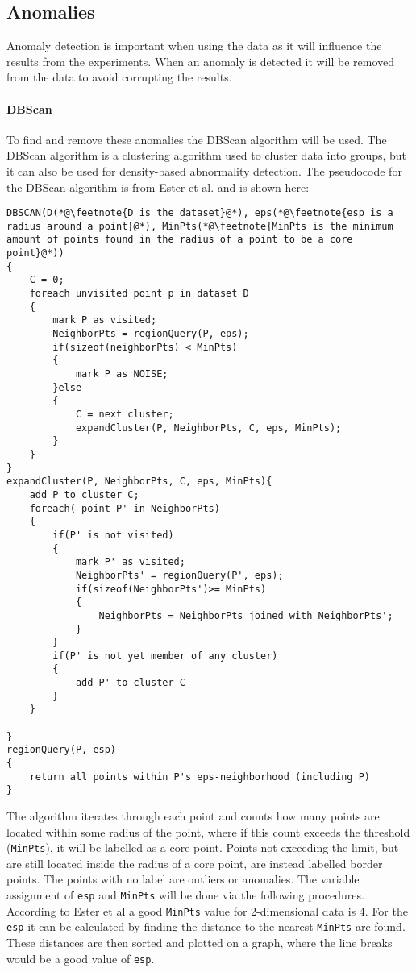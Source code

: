 \subsection{Anomalies}
Anomaly detection is important when using the data as it will influence the results from the experiments. When an anomaly is detected it will be removed from the data to avoid corrupting the results.
\paragraph{DBScan}
To find and remove these anomalies the DBScan algorithm will be used. The DBScan algorithm is a clustering algorithm used to cluster data into groups, but it can also be used for density-based abnormality detection. The pseudocode for the DBScan algorithm is from Ester et al.\cite{ester1996density} and is shown here:
\begin{lstlisting}
DBSCAN(D(*@\feetnote{D is the dataset}@*), eps(*@\feetnote{esp is a radius around a point}@*), MinPts(*@\feetnote{MinPts is the minimum amount of points found in the radius of a point to be a core point}@*))
{
    C = 0;
    foreach unvisited point p in dataset D
    {
        mark P as visited;
        NeighborPts = regionQuery(P, eps);
        if(sizeof(neighborPts) < MinPts)
        {
            mark P as NOISE;
        }else
        {
            C = next cluster;
            expandCluster(P, NeighborPts, C, eps, MinPts);
        }
    }
}
expandCluster(P, NeighborPts, C, eps, MinPts){
    add P to cluster C;
    foreach( point P' in NeighborPts)
    {
        if(P' is not visited)
        {
            mark P' as visited;
            NeighborPts' = regionQuery(P', eps);
            if(sizeof(NeighborPts')>= MinPts)
            {
                NeighborPts = NeighborPts joined with NeighborPts';
            }
        }
        if(P' is not yet member of any cluster)
        {
            add P' to cluster C
        }
    }

}
regionQuery(P, esp)
{
    return all points within P's eps-neighborhood (including P)
}
\end{lstlisting}

The algorithm iterates through each point and counts how many points are located within some radius of the point, where if this count exceeds the threshold (\texttt{MinPts}), it will be labelled as a core point. Points not exceeding the limit, but are still located inside the radius of a core point, are instead labelled border points. The points with no label are outliers or anomalies. The variable assignment of \texttt{esp} and \texttt{MinPts} will be done via the following procedures. According to Ester et al\cite[]{ester1996density} a good \texttt{MinPts} value for 2-dimensional data is 4. For the \texttt{esp} it can be calculated by finding the distance to the nearest \texttt{MinPts} are found. These distances are then sorted and plotted on a graph, where the line breaks would be a good value of \texttt{esp}.


